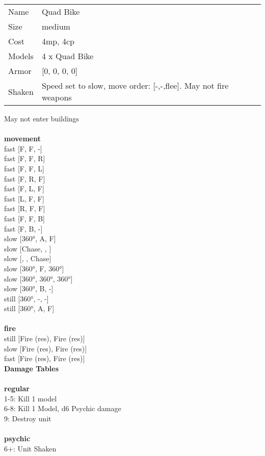 \begin{tabular}{ll}
  Name & Quad Bike \\
  Size & medium\\
  Cost & 4mp, 4cp\\
  Models & 4 x Quad Bike\\
  Armor & [0, 0, 0, 0]\\
  Shaken & Speed set to slow, move order: [-,-,flee]. May not fire weapons\\
\end{tabular}

\noindent May not enter buildings\\ 


\ \\ {\bf movement } \\
fast [F, F, -] \\
fast [F, F, R] \\
fast [F, F, L] \\
fast [F, R, F] \\
fast [F, L, F] \\
fast [L, F, F] \\
fast [R, F, F] \\
fast [F, F, B] \\
fast [F, B, -] \\
slow [360°, A, F] \\
slow [Chase, , ] \\
slow [, , Chase] \\
slow [360°, F, 360°] \\
slow [360°, 360°, 360°] \\
slow [360°, B, -] \\
still [360°, -, -] \\
still [360°, A, F] \\
\ \\ {\bf fire } \\
still [Fire (res), Fire (res)] \\
slow [Fire (res), Fire (res)] \\
fast [Fire (res), Fire (res)] \\


{\bf Damage Tables} \\
\ \\ {\bf regular } \\
1-5: Kill 1 model \\
6-8: Kill 1 Model, d6 Psychic damage \\
9: Destroy unit \\
\ \\ {\bf psychic } \\
6+: Unit Shaken \\


